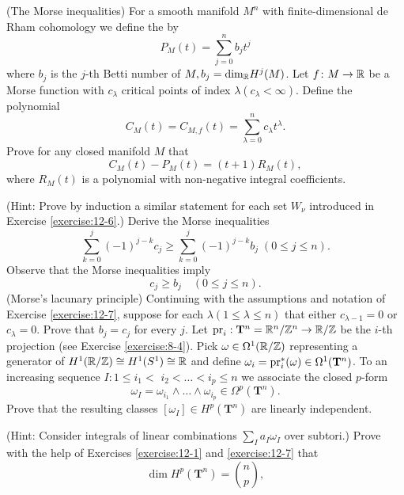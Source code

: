 \begin{enumerate}[\theexercise.1]
  \NewItem (The Morse inequalities) For a smooth manifold ${M}^{n}$ with finite-dimensional de Rham cohomology we define the 
    by
    \[
      {P}_{M}( t)  = \sum_{{j = 0}}^{n}{b}_{j}{t}^{j}
    \]
    where ${b}_{j}$ is the $j$-th Betti number of $M,{b}_{j} = {\dim }_{{\mathbb{R}}}{H}^{j}( M)$. Let $f\colon M \rightarrow  \mathbb{R}$ be a Morse function with ${c}_{\lambda }$ critical points of index $\lambda ( {{c}_{\lambda } < \infty })$. Define the polynomial
    \[
      {C}_{M}( t)  = {C}_{M,f}( t)  = \sum_{{\lambda  = 0}}^{n}{c}_{\lambda }{t}^{\lambda }.
    \]
    Prove for any closed manifold $M$ that
    \[
      {C}_{M}( t) - {P}_{M}( t)  = ( {t + 1}) {R}_{M}( t),
    \]
    where ${R}_{M}( t)$ is a polynomial with non-negative integral coefficients. \par(Hint: Prove by induction a similar statement for each set ${W}_{\nu }$ introduced in Exercise \ref{exercise:12-6}.)
    Derive the Morse inequalities
    \[
      \sum_{{k = 0}}^{j}{(-1) }^{j- k}{c}_{j} \geq  \sum_{{k = 0}}^{j}{(-1) }^{j- k}{b}_{j}\;( {0 \leq  j \leq  n}).
    \]
    Observe that the Morse inequalities imply
    \[
      {c}_{j} \geq  {b}_{j}\quad( {0 \leq  j \leq  n}).
    \]
  \NewItem (Morse's lacunary principle) Continuing with the assumptions and notation of Exercise \ref{exercise:12-7}, suppose for each $\lambda ( {1 \leq  \lambda  \leq  n})$ that either ${c}_{\lambda - 1} = 0$ or ${c}_{\lambda } = 0$. Prove that ${b}_{j} = {c}_{j}$ for every $j$.
  \NewItem Let ${\mathrm{pr}}_{i} : {\mathbf{T}}^{n} = {\mathbb{R}}^{n}/{\mathbb{Z}}^{n} \rightarrow  \mathbb{R}/\mathbb{Z}$ be the $i$-th projection (see Exercise \ref{exercise:8-4}). Pick $\omega  \in  {\Omega }^{1}( {\mathbb{R}/\mathbb{Z}})$ representing a generator of ${H}^{1}( {\mathbb{R}/\mathbb{Z}})  \cong  {H}^{1}( {S}^{1})  \cong  \mathbb{R}$ and define ${\omega }_{i} = {\mathrm{pr}}_{i}^*( \omega )  \in  {\Omega }^{1}( {\mathbf{T}}^{n})$. To an increasing sequence $I : 1 \leq  {i}_{1} <$  ${i}_{2} < \ldots  < {i}_{p} \leq  n$ we associate the closed $p$-form
    \[
      {\omega }_{I} = {\omega }_{{i}_{1}} \land  \ldots  \land  {\omega }_{{i}_{p}} \in  {\Omega }^{p}( {\mathbf{T}}^{n}).
    \]
    Prove that the resulting classes $[  {\omega }_{I}]   \in  {H}^{p}( {\mathbf{T}}^{n})$ are linearly independent. \par(Hint: Consider integrals of linear combinations $\sum_{I}{a}_{I}{\omega }_{I}$ over subtori.)
    Prove with the help of Exercises \ref{exercise:12-1} and \ref{exercise:12-7} that
    \[
      \dim {H}^{p}( {\mathbf{T}}^{n})  = \binom{n}{p},
\]
\end{enumerate}
